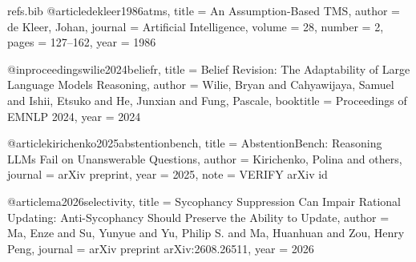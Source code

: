 \begin{filecontents*}[overwrite]{refs.bib}
@article{dekleer1986atms,
  title   = {An Assumption-Based {TMS}},
  author  = {de Kleer, Johan},
  journal = {Artificial Intelligence},
  volume  = {28},
  number  = {2},
  pages   = {127--162},
  year    = {1986}
}

@inproceedings{wilie2024beliefr,
  title     = {Belief Revision: The Adaptability of Large Language Models Reasoning},
  author    = {Wilie, Bryan and Cahyawijaya, Samuel and Ishii, Etsuko and He, Junxian and Fung, Pascale},
  booktitle = {Proceedings of EMNLP 2024},
  year      = {2024}
}

@article{kirichenko2025abstentionbench,
  title   = {{AbstentionBench}: Reasoning {LLMs} Fail on Unanswerable Questions},
  author  = {Kirichenko, Polina and others},
  journal = {arXiv preprint},
  year    = {2025},
  note    = {VERIFY arXiv id}
}

@article{ma2026selectivity,
  title   = {Sycophancy Suppression Can Impair Rational Updating: Anti-Sycophancy Should Preserve the Ability to Update},
  author  = {Ma, Enze and Su, Yunyue and Yu, Philip S. and Ma, Huanhuan and Zou, Henry Peng},
  journal = {arXiv preprint arXiv:2608.26511},
  year    = {2026}
}
\end{filecontents*}
\documentclass[11pt,twocolumn]{article}
\usepackage[a4paper,margin=2.2cm,columnsep=0.6cm]{geometry}
\usepackage[round]{natbib}

\usepackage{url}
\usepackage[hidelinks]{hyperref}
\usepackage{times}
\usepackage{latexsym}
\usepackage[T1]{fontenc}
\usepackage[utf8]{inputenc}
\usepackage{microtype}
\usepackage{booktabs}
\usepackage{graphicx}
\usepackage{multirow}
\usepackage{amsmath}
\usepackage{amssymb}
\usepackage{xcolor}
\usepackage{tikz}
\usepackage{listings}
\lstset{basicstyle=\ttfamily\scriptsize,breaklines=true,breakatwhitespace=true,columns=fullflexible,keepspaces=true,frame=single,framerule=0.3pt,aboveskip=4pt,belowskip=4pt}
\usetikzlibrary{arrows.meta,positioning,fit}

\newcommand{\todo}[1]{\textcolor{red}{\textbf{[TODO:} #1\textbf{]}}}
\newcommand{\pending}{\textcolor{gray}{\textit{pend.}}}
\newcommand{\D}{\textsc{D}}
\newcommand{\Pp}{\textsc{P}}
\newcommand{\K}{\textsc{K}}
\newcommand{\U}{\textsc{U}}
\newcommand{\ms}{MedScope}

